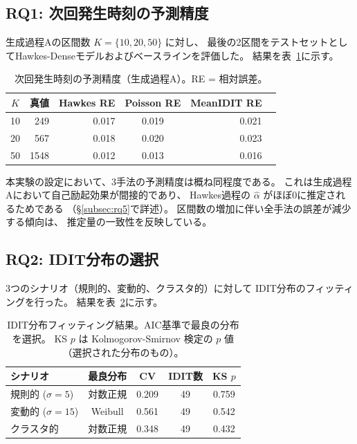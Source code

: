\subsection{RQ1: 次回発生時刻の予測精度}

生成過程Aの区間数 $K = \{10, 20, 50\}$ に対し、
最後の2区間をテストセットとしてHawkes-Denseモデルおよびベースラインを評価した。
結果を表~\ref{tab:prediction}に示す。

\begin{table}[t]
  \centering
  \caption{次回発生時刻の予測精度（生成過程A）。RE = 相対誤差。}
  \label{tab:prediction}
  \begin{tabular}{crrcrr}
    \toprule
    $K$ & 真値 & Hawkes RE & Poisson RE & MeanIDIT RE \\
    \midrule
    10 & 249 & 0.017 & 0.019 & 0.021 \\
    20 & 567 & 0.018 & 0.020 & 0.023 \\
    50 & 1548 & 0.012 & 0.013 & 0.016 \\
    \bottomrule
  \end{tabular}
\end{table}

本実験の設定において、3手法の予測精度は概ね同程度である。
これは生成過程Aにおいて自己励起効果が間接的であり、
Hawkes過程の $\hat{\alpha}$ がほぼ0に推定されるためである
（\S\ref{subsec:rq5}で詳述）。
区間数の増加に伴い全手法の誤差が減少する傾向は、
推定量の一致性を反映している。

\subsection{RQ2: IDIT分布の選択}

3つのシナリオ（規則的、変動的、クラスタ的）に対して
IDIT分布のフィッティングを行った。
結果を表~\ref{tab:idit}に示す。

\begin{table}[t]
  \centering
  \caption{IDIT分布フィッティング結果。AIC基準で最良の分布を選択。
  KS $p$ は Kolmogorov-Smirnov 検定の $p$ 値（選択された分布のもの）。}
  \label{tab:idit}
  \begin{tabular}{lcccc}
    \toprule
    シナリオ & 最良分布 & CV & IDIT数 & KS $p$ \\
    \midrule
    規則的 ($\sigma = 5$) & 対数正規 & 0.209 & 49 & 0.759 \\
    変動的 ($\sigma = 15$) & Weibull & 0.561 & 49 & 0.542 \\
    クラスタ的 & 対数正規 & 0.348 & 49 & 0.432 \\
    \bottomrule
  \end{tabular}
\end{table}

